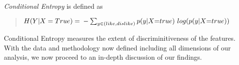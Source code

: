 \textit{Conditional Entropy} is defined as
\begin{quote}
\begin{math}
H(Y|X=True) = \\-\sum_{y\in{(like,dislike)}} p(y|X$=$true)$ $log( p(y|X$=$true))
\end{math}
\end{quote}
 Conditional Entropy measures the extent of discriminitiveness of the features.\\

With the data and methodology now defined including all dimensions of our analysis, we now proceed to an in-depth discussion of our findings.





 




